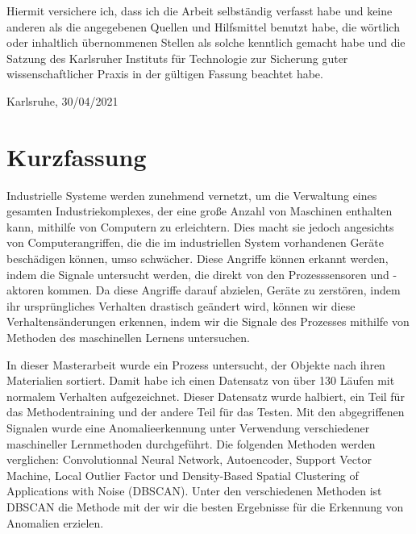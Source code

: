 \documentclass[12pt,a4paper]{scrartcl}
\numberwithin{equation}{section}
\begin{document}
Hiermit versichere ich, dass ich die Arbeit selbständig verfasst habe und keine
anderen als die angegebenen Quellen und Hilfsmittel benutzt habe, die wörtlich
oder inhaltlich übernommenen Stellen als solche kenntlich gemacht habe und die
Satzung des Karlsruher Instituts für Technologie zur Sicherung guter
wissenschaftlicher Praxis in der gültigen Fassung beachtet habe.

\vspace{1cm}

\hspace{5,5cm} Karlsruhe, 30/04/2021 \hspace{0.5cm} \makebox[2in]{\hrulefill}





 \newpage  %
  \pagestyle{headings}

  \tableofcontents


 \newpage  %
\thispagestyle{plain}

\section*{Kurzfassung}

Industrielle Systeme werden zunehmend vernetzt, um die Verwaltung eines gesamten Industriekomplexes, der eine große Anzahl von Maschinen enthalten kann, mithilfe von Computern zu erleichtern. Dies macht sie jedoch angesichts von Computerangriffen, die die im industriellen System vorhandenen Geräte beschädigen können, umso schwächer. Diese Angriffe können erkannt werden, indem die Signale untersucht werden, die direkt von den Prozesssensoren und -aktoren kommen. Da diese Angriffe darauf abzielen, Geräte zu zerstören, indem ihr ursprüngliches Verhalten drastisch geändert wird, können wir diese Verhaltensänderungen erkennen, indem wir die Signale des Prozesses mithilfe von Methoden des maschinellen Lernens untersuchen.

In dieser Masterarbeit wurde ein Prozess untersucht, der Objekte nach ihren Materialien sortiert. Damit habe ich einen Datensatz von über 130 Läufen mit normalem Verhalten aufgezeichnet. Dieser Datensatz wurde halbiert, ein Teil für das Methodentraining und der andere Teil für das Testen. Mit den abgegriffenen Signalen wurde eine Anomalieerkennung unter Verwendung verschiedener maschineller Lernmethoden durchgeführt. Die folgenden Methoden werden verglichen: Convolutionnal Neural Network, Autoencoder, Support Vector Machine, Local Outlier Factor und Density-Based Spatial Clustering of Applications with Noise (DBSCAN). Unter den verschiedenen Methoden ist DBSCAN die Methode mit der wir die besten Ergebnisse für die Erkennung von Anomalien erzielen. 
\end{document}
